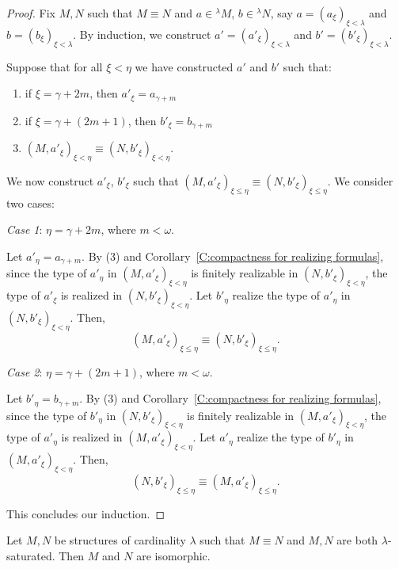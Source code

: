 \documentclass{scrartcl}
\begin{document}
\begin{proof}
Fix $M,N$ such that $M \equiv N$ and $a\in{}^\lambda M$, $b\in{}^\lambda N$,
say $a=(a_\xi)_{\xi<\lambda}$ and $b=(b_\xi)_{\xi<\lambda}$. By induction, we construct
$a'=(a'_\xi)_{\xi<\lambda}$ and $b'=(b'_\xi)_{\xi<\lambda}$.

Suppose that for all $\xi<\eta$ we have constructed $a'$ and $b'$ such that:

\begin{enumerate} [(1)]
\item if $\xi=\gamma+2m$, then $a'_\xi=a_{\gamma+m}$
\item if $\xi=\gamma+(2m+1)$, then $b'_\xi=b_{\gamma+m}$
\item $(M,a'_\xi)_{\xi<\eta} \equiv (N,b'_\xi)_{\xi<\eta}$.
\end{enumerate}

We now construct $a'_\xi$, $b'_\xi$ such that $(M,a'_\xi)_{\xi\leq\eta} \equiv (N,b'_\xi)_{\xi\leq\eta}$.
We consider two cases:


\emph{Case 1}:  $\eta=\gamma+2m$, where $m<\omega$. 

Let $a'_\eta=a_{\gamma+m}$. By (3) and Corollary~\ref{C:compactness for realizing formulas}, since the type of $a'_\eta$ in $(M,a'_\xi)_{\xi<\eta}$ is finitely realizable in  $(N,b'_\xi)_{\xi<\eta}$, the type of $a'_\xi$ is realized in $(N,b'_\xi)_{\xi<\eta}$. Let $b'_\eta$ realize the type of $a'_\eta$ in $(N,b'_\xi)_{\xi<\eta}$. Then,
\[
(M,a'_\xi)_{\xi\leq\eta} \equiv (N,b'_\xi)_{\xi\leq\eta}.
\]


\emph{Case 2}: $\eta=\gamma+(2m+1)$, where $m<\omega$.

Let $b'_\eta=b_{\gamma+m}$. By (3) and Corollary~\ref{C:compactness for realizing formulas}, since the type of $b'_\eta$ in $(N,b'_\xi)_{\xi<\eta}$ is finitely realizable in $(M, a'_\xi)_{\xi<\eta}$, the type of $a'_\eta$ is realized in $(M,a'_\xi)_{\xi<\eta}$. Let $a'_\eta$ realize the type of $b'_\eta$ in $(M,a'_\xi)_{\xi<\eta}$. Then,
\[
(N,b'_\xi)_{\xi\leq\eta} \equiv (M,a'_\xi)_{\xi\leq\eta}.
\]

This concludes our induction.

 \end{proof}

\begin{theorem}

Let $M,N$ be structures of cardinality $\lambda$ such that $M \equiv N$ and $M,N$ are both $\lambda$-saturated. Then $M$ and $N$ are isomorphic.

\end{theorem}
\label{T:uniqueness of saturated structures}
\end{document}
